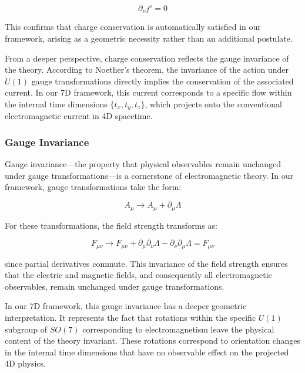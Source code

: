 \documentclass{article}
\begin{document}
\begin{equation}
\partial_{\nu}j^{\nu} = 0
\end{equation}

This confirms that charge conservation is automatically satisfied in our framework, arising as a geometric necessity rather than an additional postulate.

From a deeper perspective, charge conservation reflects the gauge invariance of the theory. According to Noether's theorem, the invariance of the action under $U(1)$ gauge transformations directly implies the conservation of the associated current. In our 7D framework, this current corresponds to a specific flow within the internal time dimensions $\{t_x, t_y, t_z\}$, which projects onto the conventional electromagnetic current in 4D spacetime.

\subsubsection{Gauge Invariance}

Gauge invariance—the property that physical observables remain unchanged under gauge transformations—is a cornerstone of electromagnetic theory. In our framework, gauge transformations take the form:

\begin{equation}
A_{\mu} \rightarrow A_{\mu} + \partial_{\mu}\Lambda
\end{equation}

For these transformations, the field strength transforms as:

\begin{equation}
F_{\mu\nu} \rightarrow F_{\mu\nu} + \partial_{\mu}\partial_{\nu}\Lambda - \partial_{\nu}\partial_{\mu}\Lambda = F_{\mu\nu}
\end{equation}

since partial derivatives commute. This invariance of the field strength ensures that the electric and magnetic fields, and consequently all electromagnetic observables, remain unchanged under gauge transformations.

In our 7D framework, this gauge invariance has a deeper geometric interpretation. It represents the fact that rotations within the specific $U(1)$ subgroup of $SO(7)$ corresponding to electromagnetism leave the physical content of the theory invariant. These rotations correspond to orientation changes in the internal time dimensions that have no observable effect on the projected 4D physics.
\end{document}
